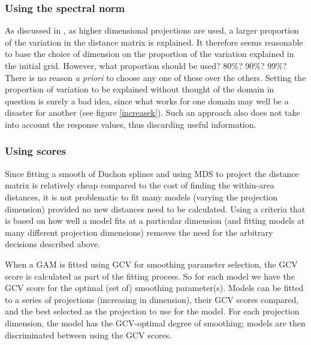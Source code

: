 \subsubsection{Using the spectral norm}

As discussed in , as higher dimensional projections are used, a larger proportion of the variation in the distance matrix is explained. It therefore seems reasonable to base the choice of dimension on the proportion of the variation explained in the initial grid. However, what proportion should be used? 80\%? 90\%? 99\%? There is no reason \textit{a priori} to choose any one of these over the others. Setting the proportion of variation to be explained without thought of the domain in question is surely a bad idea, since what works for one domain may well be a disaster for another (see figure \ref{increasek}). Such an approach also does not take into account the response values, thus discarding useful information.

\subsubsection{Using scores}

Since fitting a smooth of Duchon splines and using MDS to project the distance matrix is relatively cheap compared to the cost of finding the within-area distances, it is not problematic to fit many models (varying the projection dimension) provided no new distances need to be calculated. \label{cor-r51}Using a criteria that is based on how well a model fits at a particular dimension (and fitting models at many different projection dimensions) removes the need for the arbitrary decisions described above.

When a GAM is fitted using GCV for smoothing parameter selection, the GCV score is calculated as part of the fitting process. So for each model we have the GCV score for the optimal (set of) smoothing parameter(s). Models can be fitted to a series of projections (increasing in dimension), their GCV scores compared, and the best selected as the projection to use for the model. For each projection dimension, the model has the GCV-optimal degree of smoothing; models are then discriminated between using the GCV scores.

